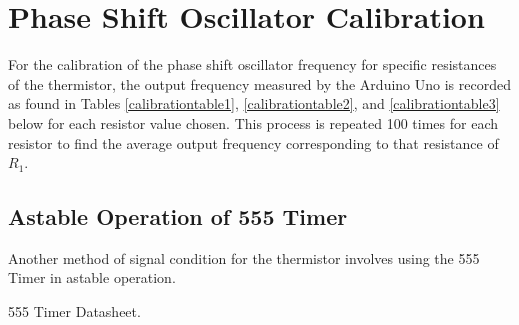 \section{Phase Shift Oscillator Calibration}
\label{psocalibration}

For the calibration of the phase shift oscillator frequency for specific resistances of the thermistor, the output frequency measured by the Arduino Uno is recorded as found in Tables \ref{calibrationtable1}, \ref{calibrationtable2}, and \ref{calibrationtable3} below for each resistor value chosen. This process is repeated 100 times for each resistor to find the average output frequency corresponding to that resistance of $R_1$.  \\

\subsection{Astable Operation of 555 Timer}

Another method of signal condition for the thermistor involves using the 555 Timer in astable operation. 

555 Timer Datasheet. 


